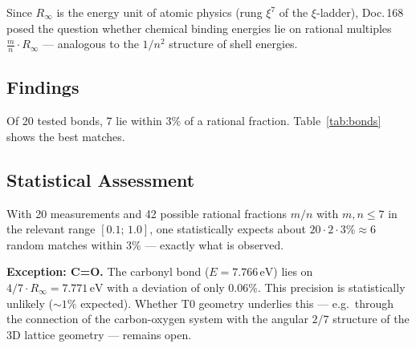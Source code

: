 Since $R_\infty$ is the energy unit of atomic physics (rung $\xi^7$ of the
$\xi$-ladder), Doc.\,168 posed the question whether chemical binding energies
lie on rational multiples $\frac{m}{n} \cdot R_\infty$ — analogous to the
$1/n^2$ structure of shell energies.

\subsection{Findings}
\label{subsec:findings-be}

Of 20 tested bonds, 7 lie within $3\%$ of a rational fraction.
Table~\ref{tab:bonds} shows the best matches.

\begin{table}[htbp]
\centering
\caption{Binding energies on rational multiples of $R_\infty$ (NIST values)}
\label{tab:bonds}
\end{table}

\subsection{Statistical Assessment}
\label{subsec:statistics-be}

With 20 measurements and 42 possible rational fractions $m/n$ with $m,n \leq 7$
in the relevant range $[0.1;\, 1.0]$, one statistically expects about
$20 \cdot 2 \cdot 3\% \approx 6$ random matches within $3\%$
— exactly what is observed.

\textbf{Exception: C=O.}
The carbonyl bond ($E = 7.766\,\mathrm{eV}$) lies on
$4/7 \cdot R_\infty = 7.771\,\mathrm{eV}$ with a deviation of only $0.06\%$.
This precision is statistically unlikely ($\sim1\%$ expected). Whether
T0 geometry underlies this — e.g.\ through the connection of the
carbon-oxygen system with the angular $2/7$ structure of the 3D lattice
geometry — remains open.

